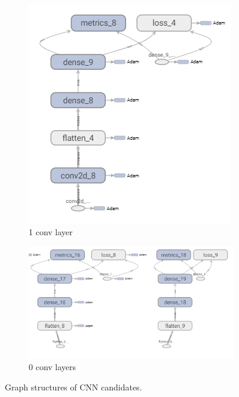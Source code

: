 \begin{figure}
	\begin{subfigure}[b]{0.3\linewidth}
		\includegraphics[width=\linewidth]{plots/cnn-candidates-1-conv.png}
		\caption{1 conv layer}
	\end{subfigure}
	\begin{subfigure}[b]{0.3\linewidth}
		\includegraphics[width=\linewidth]{plots/cnn-candidates-0-conv.png}
		\caption{0 conv layers}
	\end{subfigure}
	\caption{Graph structures of \gls{CNN} candidates.}
	\label{fig:cnn-structure-abstract}
\end{figure}

